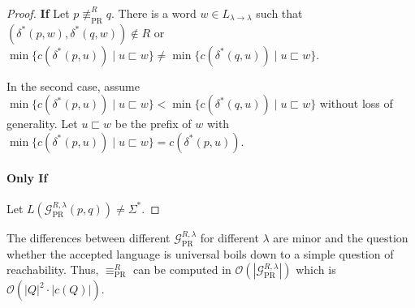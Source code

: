 \begin{proof}
	\textbf{If } Let $p \not\equiv_\text{PR}^R q$. There is a word $w \in L_{\lambda \rightarrow \lambda}$ such that $(\delta^*(p, w), \delta^*(q, w)) \notin R$ or $\min \{ c(\delta^*(p, u)) \mid u \sqsubset w \} \neq \min \{ c(\delta^*(q, u)) \mid u \sqsubset w \}$.
	
	In the second case, assume $\min \{ c(\delta^*(p, u)) \mid u \sqsubset w \} < \min \{ c(\delta^*(q, u)) \mid u \sqsubset w \}$ without loss of generality. Let $u \sqsubset w$ be the prefix of $w$ with $\min \{ c(\delta^*(p, u)) \mid u \sqsubset w \} = c(\delta^*(p, u))$. 
	
	\paragraph{Only If} Let $L(\mathcal{G}_\text{PR}^{R,\lambda}(p, q)) \neq \Sigma^*$. %
\end{proof}

The differences between different $\mathcal{G}_\text{PR}^{R,\lambda}$ for different $\lambda$ are minor and the question whether the accepted language is universal boils down to a simple question of reachability. Thus, $\equiv_\text{PR}^R$ can be computed in $\mathcal{O}(|\mathcal{G}_\text{PR}^{R,\lambda}|)$ which is $\mathcal{O}(|Q|^2 \cdot |c(Q)|)$.






















